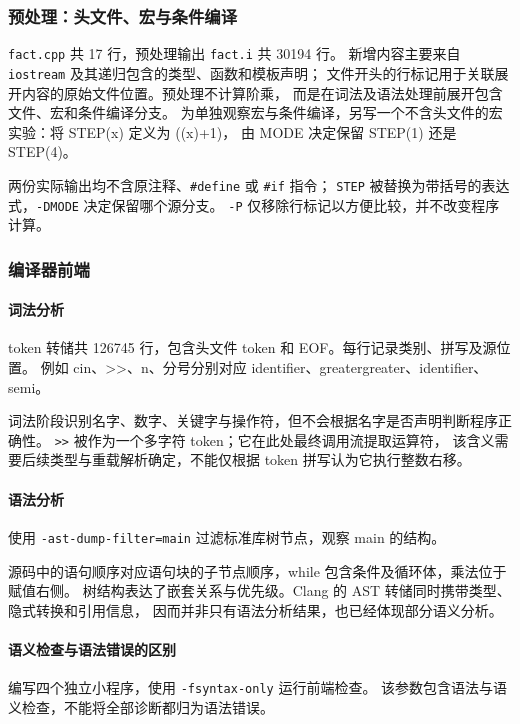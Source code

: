 \subsubsection{预处理：头文件、宏与条件编译}
\texttt{fact.cpp} 共 17 行，预处理输出 \texttt{fact.i} 共 30194 行。
新增内容主要来自 \texttt{iostream} 及其递归包含的类型、函数和模板声明；
文件开头的行标记用于关联展开内容的原始文件位置。预处理不计算阶乘，
而是在词法及语法处理前展开包含文件、宏和条件编译分支。
为单独观察宏与条件编译，另写一个不含头文件的宏实验：将 STEP(x) 定义为 ((x)+1)，
由 MODE 决定保留 STEP(1) 还是 STEP(4)。


两份实际输出均不含原注释、\texttt{\#define} 或 \texttt{\#if} 指令；
\texttt{STEP} 被替换为带括号的表达式，\texttt{-DMODE} 决定保留哪个源分支。
\texttt{-P} 仅移除行标记以方便比较，并不改变程序计算。

\subsubsection{编译器前端}
\paragraph{词法分析}

token 转储共 126745 行，包含头文件 token 和 EOF。每行记录类别、拼写及源位置。
例如 cin、>>、n、分号分别对应 identifier、greatergreater、identifier、semi。

词法阶段识别名字、数字、关键字与操作符，但不会根据名字是否声明判断程序正确性。
\texttt{>>} 被作为一个多字符 token；它在此处最终调用流提取运算符，
该含义需要后续类型与重载解析确定，不能仅根据 token 拼写认为它执行整数右移。

\paragraph{语法分析}
使用 \texttt{-ast-dump-filter=main} 过滤标准库树节点，观察 main 的结构。


源码中的语句顺序对应语句块的子节点顺序，while 包含条件及循环体，乘法位于赋值右侧。
树结构表达了嵌套关系与优先级。Clang 的 AST 转储同时携带类型、隐式转换和引用信息，
因而并非只有语法分析结果，也已经体现部分语义分析。

\paragraph{语义检查与语法错误的区别}
编写四个独立小程序，使用 \texttt{-fsyntax-only} 运行前端检查。
该参数包含语法与语义检查，不能将全部诊断都归为语法错误。

